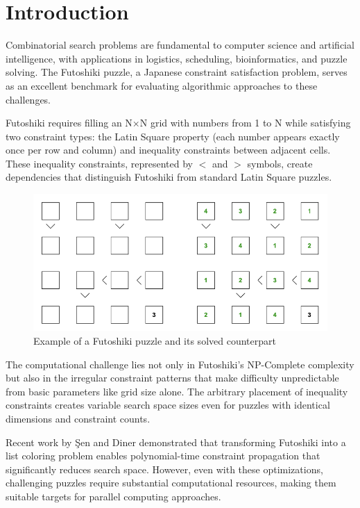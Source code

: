 \section{Introduction}
\label{sec:intro}
Combinatorial search problems are fundamental to computer science and artificial intelligence, with applications in logistics, scheduling, bioinformatics, and puzzle solving. The Futoshiki puzzle, a Japanese constraint satisfaction problem, serves as an excellent benchmark for evaluating algorithmic approaches to these challenges.

Futoshiki requires filling an N×N grid with numbers from 1 to N while satisfying two constraint types: the Latin Square property (each number appears exactly once per row and column) and inequality constraints between adjacent cells. These inequality constraints, represented by $<$ and $>$ symbols, create dependencies that distinguish Futoshiki from standard Latin Square puzzles.

\begin{figure}[H]
\centering
\includegraphics[scale=0.6]{imgs/futoshiki_example.png}
\caption{Example of a Futoshiki puzzle and its solved counterpart \cite{Sen2024Futoshiki}}
\label{fig:futoshiki_example}
\end{figure}

The computational challenge lies not only in Futoshiki's NP-Complete complexity but also in the irregular constraint patterns that make difficulty unpredictable from basic parameters like grid size alone. The arbitrary placement of inequality constraints creates variable search space sizes even for puzzles with identical dimensions and constraint counts.

Recent work by Şen and Diner \cite{Sen2024Futoshiki} demonstrated that transforming Futoshiki into a list coloring problem enables polynomial-time constraint propagation that significantly reduces search space. However, even with these optimizations, challenging puzzles require substantial computational resources, making them suitable targets for parallel computing approaches.

